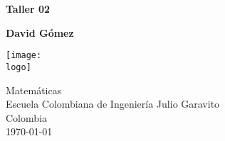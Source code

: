 \documentclass{article}
\newcommand{\logo}{C:/Users/usuario/Documents/U/logo-eci.jpg}
\begin{document}
\begin{titlepage}
	\begin{center}
		\vspace*{1cm}

		\textbf{\Huge{Taller 02}}

		\vspace{1.5cm}

		\textbf{\large{David Gómez}}

		\vspace{4cm}

		\texttt{[image: \\logo]}

		\vspace{5cm}

		Matemáticas\\
		Escuela Colombiana de Ingeniería Julio Garavito\\
		Colombia\\
		\today

	\end{center}
\end{titlepage}
\clearpage
\tableofcontents
\clearpage
\end{document}
